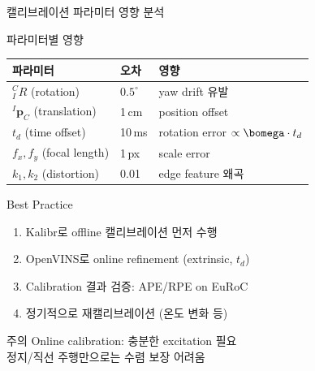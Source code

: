 \begin{frame}[shrink=10]{캘리브레이션 파라미터 영향 분석}
  \begin{block}{파라미터별 영향}
    \begin{tabular}{lll}
      \textbf{파라미터} & \textbf{오차} & \textbf{영향} \\\hline
      ${}^C_I R$ (rotation) & $0.5^\circ$ & yaw drift 유발 \\
      ${}^I\bm{p}_C$ (translation) & 1\,cm & position offset \\
      $t_d$ (time offset) & 10\,ms & rotation error $\propto \bomega \cdot t_d$ \\
      $f_x, f_y$ (focal length) & 1\,px & scale error \\
      $k_1, k_2$ (distortion) & 0.01 & edge feature 왜곡 \\
    \end{tabular}
  \end{block}
  \begin{block}{Best Practice}
    \begin{enumerate}
      \item Kalibr로 offline 캘리브레이션 먼저 수행
      \item OpenVINS로 online refinement (extrinsic, $t_d$)
      \item Calibration 결과 검증: APE/RPE on EuRoC
      \item 정기적으로 재캘리브레이션 (온도 변화 등)
    \end{enumerate}
  \end{block}
  \begin{alertblock}{주의}
    Online calibration: 충분한 excitation 필요\\
    정지/직선 주행만으로는 수렴 보장 어려움
  \end{alertblock}
\end{frame}



